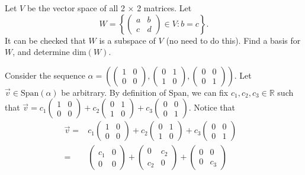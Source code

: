 \documentclass[12pt]{article}
\newenvironment{problem}[2][Problem]
{
	\begin{trivlist} 
		\item[\hskip \labelsep {\bfseries #1 #2:}]
	}
{
	\end{trivlist}
	}
\newenvironment{solution}[1][Solution]
{
	\begin{trivlist} 
		\item[\hskip \labelsep {\itshape #1:}]
	}
	{
	\end{trivlist}
}
\begin{document}
\newpage
\begin{problem}{4}
Let $V$ be the vector space of all 2 $\times$ 2 matrices. Let
\[
W = \left\{ \begin{pmatrix} a&b\\c&d\end{pmatrix} \in V: b=c \right \}\text{.}
\]
It can be checked that $W$ is a subspace of $V$ (no need to do this). Find a basis for $W$, and determine dim$(W)$.
\noindent
\newline
\newline
\begin{solution}
Consider the sequence $\alpha=\left( \begin{pmatrix} 1&0\\0&0 \end{pmatrix}, \begin{pmatrix} 0&1\\1&0 \end{pmatrix}, \begin{pmatrix} 0&0\\0&1 \end{pmatrix} \right)$.
Let $\vec{v} \in \text{Span}(\alpha)$ be arbitrary. By definition of Span, we can fix $c_1,c_2,c_3 \in \mathbb{R}$ such that $\vec{v} = c_1 \begin{pmatrix} 1&0\\0&0 \end{pmatrix} + c_2 \begin{pmatrix} 0&1\\1&0 \end{pmatrix} + c_3 \begin{pmatrix} 0&0\\0&1 \end{pmatrix}$. Notice that
\begin{align*}
\vec{v}=&c_1 \begin{pmatrix} 1&0\\0&0 \end{pmatrix} + c_2 \begin{pmatrix} 0&1\\1&0 \end{pmatrix} + c_3 \begin{pmatrix} 0&0\\0&1 \end{pmatrix} &\\
=&\begin{pmatrix} c_1&0\\0&0 \end{pmatrix} + \begin{pmatrix} 0&c_2\\c_2&0 \end{pmatrix} + \begin{pmatrix} 0&0\\0&c_3 \end{pmatrix} &\\

\end{align*}
\end{solution}
\end{problem}
\end{document}
